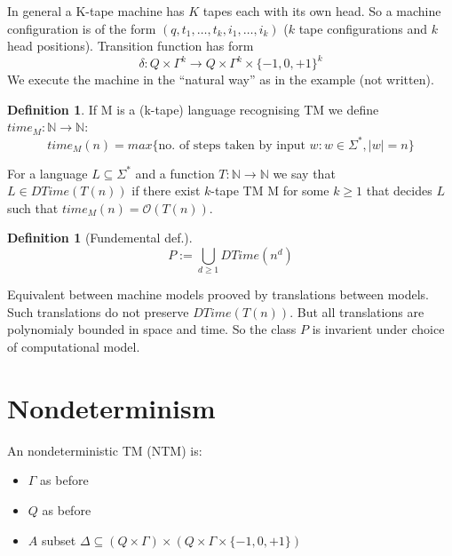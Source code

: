 \documentclass[a4paper,12pt]{article}
\theoremstyle{definition}
\newtheorem{definition}[counter]{Definition}
\theoremstyle{remark}
\newcommand{\N}{\mathbb{N}}
\begin{document}
In general a K-tape machine has $K$ tapes each with its own head. So a machine configuration is of the form 
$(q, t_1, \dots, t_k, i_1, \dots, i_k)$ ($k$ tape configurations and $k$ head positions).
Transition function has form
\begin{equation*}
    \delta: Q \times \Gamma^k \to Q \times \Gamma^k \times \{-1, 0, +1\}^k
\end{equation*}
We execute the machine in the ``natural way'' as in the example (not written).

\begin{definition}
    If M is a (k-tape) language recognising TM we define $time_M: \N \to \N$:
    \begin{equation*}
        time_M(n) = max \{\text{no. of steps taken by input }w: w \in \Sigma^*,  |w| = n\}
    \end{equation*}

    For a language $L \subseteq \Sigma^*$ and a function $T: \N \to \N$ we say that $L \in DTime(T(n))$ if there exist $k$-tape TM M for
    some $k \geq 1$ that decides $L$ such that $time_M(n) = \mathscr{O}(T(n))$.
\end{definition}

\begin{definition}[Fundemental def.]
    \begin{equation*}
        P := \bigcup\limits_{d \geq 1} DTime(n^d)
    \end{equation*}
\end{definition}

Equivalent between machine models prooved by translations between models. Such translations do not preserve $DTime(T(n))$. But 
all translations are polynomialy bounded in space and time. So the class $P$ is invarient under choice of computational model.






\newpage
\section{Nondeterminism}
An nondeterministic TM (NTM) is:
\begin{itemize}
    \item $\Gamma$ as before
    \item $Q$ as before
    \item $A$ subset $\Delta \subseteq (Q \times \Gamma) \times (Q \times \Gamma \times \{-1, 0, +1\})$
\end{itemize}
\end{document}
